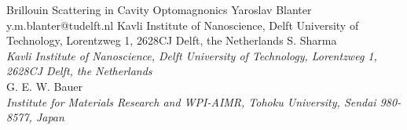 \begin{conf-abstract}[]
{Brillouin Scattering in Cavity Optomagnonics}
{\color{blue} Yaroslav Blanter}
{y.m.blanter@tudelft.nl}
{Kavli Institute of Nanoscience, Delft University of Technology, Lorentzweg 1, 2628CJ Delft, the Netherlands}
{{\color{blue}S. Sharma}\\ \textit{Kavli Institute of Nanoscience, Delft University of Technology, Lorentzweg 1, 2628CJ Delft, the Netherlands}\\ 
{\color{blue}G. E. W. Bauer}\\ \textit{ Institute for Materials Research and WPI-AIMR, Tohoku University, Sendai 980-8577, Japan}\\ 
\decofourleft \decofourright}





\printbibliography[heading=none]

\end{conf-abstract}
